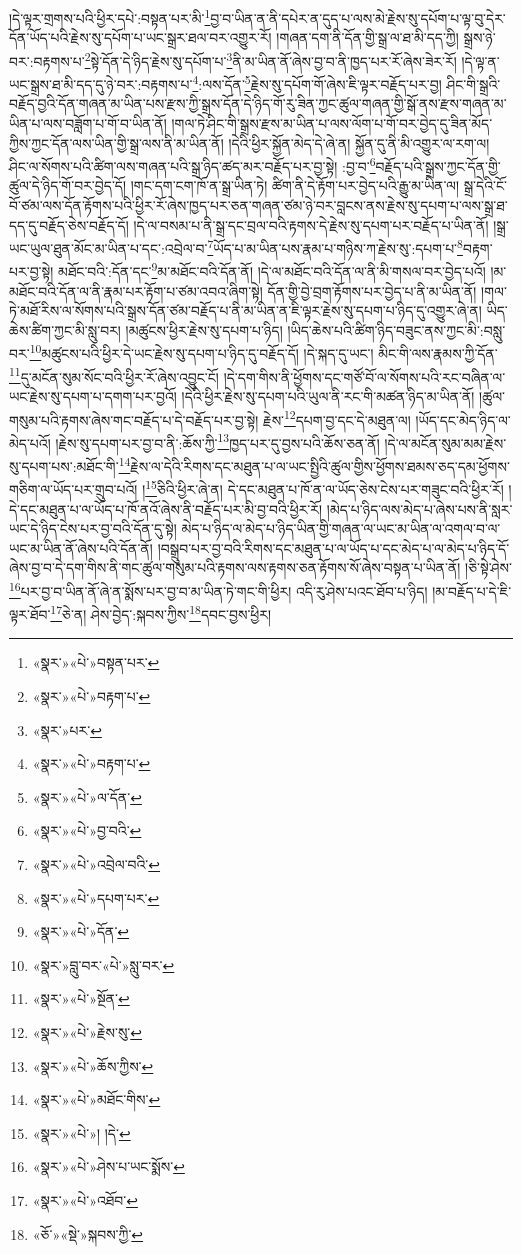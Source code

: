 །དེ་ལྟར་གྲགས་པའི་ཕྱིར་དཔེ་:བསྟན་པར་མི་\footnote{«སྣར་»«པེ་»བསྟན་པར་}བྱ་བ་ཡིན་ན་ནི་དཔེར་ན་དུད་པ་ལས་མེ་རྗེས་སུ་དཔོག་པ་ལྟ་བུ་དེར་དོན་ཡོད་པའི་རྗེས་སུ་དཔོག་པ་ཡང་སྒྲར་ཐལ་བར་འགྱུར་རོ། །གཞན་དག་ནི་དོན་གྱི་སྒྲ་ལ་ཐ་མི་དད་ཀྱི། སྒྲས་ཉེ་བར་:བརྟགས་པ་\footnote{«སྣར་»«པེ་»བརྟག་པ་}སྟེ་དོན་དེ་ཉིད་རྗེས་སུ་དཔོག་པ་\footnote{«སྣར་»པར་}ནི་མ་ཡིན་ནོ་ཞེས་བྱ་བ་ནི་ཁྱད་པར་རོ་ཞེས་ཟེར་རོ། །དེ་ལྟ་ན་ཡང་སྒྲས་ཐ་མི་དད་དུ་ཉེ་བར་:བརྟགས་པ་\footnote{«སྣར་»«པེ་»བརྟག་པ་}:ལས་དོན་\footnote{«སྣར་»«པེ་»ལ་དོན་}རྗེས་སུ་དཔོག་གོ་ཞེས་ཇི་ལྟར་བརྗོད་པར་བྱ། ཤིང་གི་སྒྲའི་བརྗོད་བྱའི་དོན་གཞན་མ་ཡིན་པས་རྫས་ཀྱི་སྒྲས་དོན་དེ་ཉིད་གོ་རུ་ཟིན་ཀྱང་ཚུལ་གཞན་གྱི་སྒོ་ནས་རྫས་གཞན་མ་ཡིན་པ་ལས་བཟློག་པ་གོ་བ་ཡིན་ནོ། །གལ་ཏེ་ཤིང་གི་སྒྲས་རྫས་མ་ཡིན་པ་ལས་ལོག་པ་གོ་བར་བྱེད་དུ་ཟིན་མོད་ཀྱིས་ཀྱང་དོན་ལས་ཡིན་གྱི་སྒྲ་ལས་ནི་མ་ཡིན་ནོ། །དེའི་ཕྱིར་སྐྱོན་མེད་དེ་ཞེ་ན། སྐྱོན་དུ་ནི་མི་འགྱུར་ལ་རག་ལ། ཤིང་ལ་སོགས་པའི་ཚིག་ལས་གཞན་པའི་སྒྲ་ཉིད་ཚད་མར་བརྗོད་པར་བྱ་སྟེ། :བྱ་བ་\footnote{«སྣར་»«པེ་»བྱ་བའི་}བརྗོད་པའི་སྒྲས་ཀྱང་དོན་གྱི་ཚུལ་དེ་ཉིད་གོ་བར་བྱེད་དོ། །གང་དག་ངག་ཁོ་ན་སྒྲ་ཡིན་ཏེ། ཚིག་ནི་དེ་རྟོག་པར་བྱེད་པའི་རྒྱུ་མ་ཡིན་ལ། སྒྲ་དེའི་ངོ་བོ་ཙམ་ལས་དོན་རྟོགས་པའི་ཕྱིར་རོ་ཞེས་ཁྱད་པར་ཅན་གཞན་ཙམ་ཉེ་བར་བླངས་ནས་རྗེས་སུ་དཔག་པ་ལས་སྒྲ་ཐ་དད་དུ་བརྗོད་ཅེས་བརྗོད་དོ། །དེ་ལ་བསམ་པ་ནི་སྒྲ་དང་བྲལ་བའི་རྟགས་དེ་རྗེས་སུ་དཔག་པར་བརྗོད་པ་ཡིན་ནོ། །སྒྲ་ཡང་ཡུལ་ཐུན་མོང་མ་ཡིན་པ་དང་:འབྲེལ་བ་\footnote{«སྣར་»«པེ་»འབྲེལ་བའི་}ཡོད་པ་མ་ཡིན་པས་རྣམ་པ་གཉིས་ཀ་རྗེས་སུ་:དཔག་པ་\footnote{«སྣར་»«པེ་»དཔག་པར་}བརྟག་པར་བྱ་སྟེ། མཐོང་བའི་:དོན་དང་\footnote{«སྣར་»«པེ་»དོན་}མ་མཐོང་བའི་དོན་ནོ། །དེ་ལ་མཐོང་བའི་དོན་ལ་ནི་མི་གསལ་བར་བྱེད་པའོ། །མ་མཐོང་བའི་དོན་ལ་ནི་རྣམ་པར་རྟོག་པ་ཙམ་འབའ་ཞིག་སྟེ། དོན་གྱི་བྱེ་བྲག་རྟོགས་པར་བྱེད་པ་ནི་མ་ཡིན་ནོ། །གལ་ཏེ་མཐོ་རིས་ལ་སོགས་པའི་སྒྲས་དོན་ཙམ་བརྗོད་པ་ནི་མ་ཡིན་ན་ཇི་ལྟར་རྗེས་སུ་དཔག་པ་ཉིད་དུ་འགྱུར་ཞེ་ན། ཡིད་ཆེས་ཚིག་ཀྱང་མི་སླུ་བར། །མཚུངས་ཕྱིར་རྗེས་སུ་དཔག་པ་ཉིད། །ཡིད་ཆེས་པའི་ཚིག་ཉིད་བཟུང་ནས་ཀྱང་མི་:བསླུ་བར་\footnote{«སྣར་»བླུ་བར་«པེ་»སླུ་བར་}མཚུངས་པའི་ཕྱིར་དེ་ཡང་རྗེས་སུ་དཔག་པ་ཉིད་དུ་བརྗོད་དོ། །དེ་སྐད་དུ་ཡང་། མིང་གི་ལས་རྣམས་ཀྱི་དོན་\footnote{«སྣར་»«པེ་»སྔོན་}དུ་མངོན་སུམ་སོང་བའི་ཕྱིར་རོ་ཞེས་འབྱུང་ངོ། །དེ་དག་གིས་ནི་ཕྱོགས་དང་གཙོ་བོ་ལ་སོགས་པའི་རང་བཞིན་ལ་ཡང་རྗེས་སུ་དཔག་པ་དགག་པར་བྱའོ། །དེའི་ཕྱིར་རྗེས་སུ་དཔག་པའི་ཡུལ་ནི་རང་གི་མཚན་ཉིད་མ་ཡིན་ནོ། །ཚུལ་གསུམ་པའི་རྟགས་ཞེས་གང་བརྗོད་པ་དེ་བརྗོད་པར་བྱ་སྟེ། རྗེས་\footnote{«སྣར་»«པེ་»རྗེས་སུ་}དཔག་བྱ་དང་དེ་མཐུན་ལ། །ཡོད་དང་མེད་ཉིད་ལ་མེད་པའོ། །རྗེས་སུ་དཔག་པར་བྱ་བ་ནི་:ཆོས་ཀྱི་\footnote{«སྣར་»«པེ་»ཆོས་ཀྱིས་}ཁྱད་པར་དུ་བྱས་པའི་ཆོས་ཅན་ནོ། །དེ་ལ་མངོན་སུམ་མམ་རྗེས་སུ་དཔག་པས་:མཐོང་གི་\footnote{«སྣར་»«པེ་»མཐོང་གིས་}རྗེས་ལ་དེའི་རིགས་དང་མཐུན་པ་ལ་ཡང་སྤྱིའི་ཚུལ་གྱིས་ཕྱོགས་ཐམས་ཅད་དམ་ཕྱོགས་གཅིག་ལ་ཡོད་པར་གྲུབ་པའོ། །\footnote{«སྣར་»«པེ་»། །དེ་}ཅིའི་ཕྱིར་ཞེ་ན། དེ་དང་མཐུན་པ་ཁོ་ན་ལ་ཡོད་ཅེས་ངེས་པར་གཟུང་བའི་ཕྱིར་རོ། །དེ་དང་མཐུན་པ་ལ་ཡོད་པ་ཁོ་ནའོ་ཞེས་ནི་བརྗོད་པར་མི་བྱ་བའི་ཕྱིར་རོ། །མེད་པ་ཉིད་ལས་མེད་པ་ཞེས་པས་ནི་སླར་ཡང་དེ་ཉིད་ངེས་པར་བྱ་བའི་དོན་དུ་སྟེ། མེད་པ་ཉིད་ལ་མེད་པ་ཉིད་ཡིན་གྱི་གཞན་ལ་ཡང་མ་ཡིན་ལ་འགལ་བ་ལ་ཡང་མ་ཡིན་ནོ་ཞེས་པའི་དོན་ནོ། །བསྒྲུབ་པར་བྱ་བའི་རིགས་དང་མཐུན་པ་ལ་ཡོད་པ་དང་མེད་པ་ལ་མེད་པ་ཉིད་དོ་ཞེས་བྱ་བ་དེ་དག་གིས་ནི་གང་ཚུལ་གསུམ་པའི་རྟགས་ལས་རྟགས་ཅན་རྟོགས་སོ་ཞེས་བསྟན་པ་ཡིན་ནོ། །ཅི་སྟེ་ཤེས་\footnote{«སྣར་»«པེ་»ཤེས་པ་ཡང་སྨོས་}པར་བྱ་བ་ཡིན་ནོ་ཞེ་ན་སྨོས་པར་བྱ་བ་མ་ཡིན་ཏེ་གང་གི་ཕྱིར། འདི་རུ་ཤེས་པའང་ཐོབ་པ་ཉིད། །མ་བརྗོད་པ་དེ་ཇི་ལྟར་ཐོབ་\footnote{«སྣར་»«པེ་»འཐོབ་}ཅེ་ན། ཤེས་བྱེད་:སྐབས་ཀྱིས་\footnote{«ཅོ་»«སྡེ་»སྐབས་ཀྱི་}དབང་བྱས་ཕྱིར། 